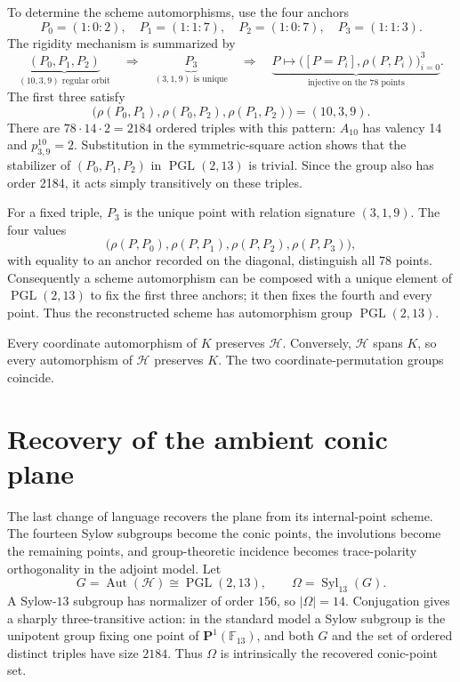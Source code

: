 \documentclass[11pt]{article}
\theoremstyle{definition}
\theoremstyle{remark}
\newcommand{\F}{\mathbb F}
\newcommand{\PGL}{\operatorname{PGL}}
\newcommand{\Aut}{\operatorname{Aut}}
\begin{document}
To determine the scheme automorphisms, use the four anchors
\[
 P_0=(1:0:2),\quad P_1=(1:1:7),\quad
 P_2=(1:0:7),\quad P_3=(1:1:3).
\]
The rigidity mechanism is summarized by
\[
 \underbrace{(P_0,P_1,P_2)}_{(10,3,9)\text{ regular orbit}}
 \quad\Longrightarrow\quad
 \underbrace{P_3}_{(3,1,9)\text{ is unique}}
 \quad\Longrightarrow\quad
 \underbrace{P\longmapsto
   \bigl([P=P_i],\rho(P,P_i)\bigr)_{i=0}^{3}}
   _{\text{injective on the 78 points}}.
\]
The first three satisfy
\[
 \bigl(\rho(P_0,P_1),\rho(P_0,P_2),\rho(P_1,P_2)\bigr)=(10,3,9).
\]
There are
\(78\cdot14\cdot2=2184\) ordered triples with this pattern: \(A_{10}\)
has valency 14 and \(p_{3,9}^{10}=2\).  Substitution in the symmetric-square
action shows that the stabilizer of \((P_0,P_1,P_2)\) in
\(\PGL(2,13)\) is trivial.  Since the group also has order 2184, it acts
simply transitively on these triples.

For a fixed triple, \(P_3\) is the unique point with relation signature
\((3,1,9)\).  The four values
\[
 \bigl(\rho(P,P_0),\rho(P,P_1),\rho(P,P_2),\rho(P,P_3)\bigr),
\]
with equality to an anchor recorded on the diagonal, distinguish all 78
points.  Consequently a scheme automorphism can be composed with a unique
element of \(\PGL(2,13)\) to fix the first three anchors; it then fixes the
fourth and every point.  Thus the reconstructed scheme has automorphism
group \(\PGL(2,13)\).

Every coordinate automorphism of \(K\) preserves \(\mathcal H\).
Conversely, \(\mathcal H\) spans \(K\), so every automorphism of
\(\mathcal H\) preserves \(K\).  The two coordinate-permutation groups
coincide.

\section{Recovery of the ambient conic plane}
\label{sec:ambient-plane}

The last change of language recovers the plane from its internal-point scheme.
The fourteen Sylow subgroups become the conic points, the involutions become
the remaining points, and group-theoretic incidence becomes trace-polarity
orthogonality in the adjoint model.
Let
\[
 G=\Aut(\mathcal H)\cong\PGL(2,13),\qquad
 \Omega=\operatorname{Syl}_{13}(G).
\]
A Sylow-\(13\) subgroup has normalizer of order \(156\), so \(|\Omega|=14\).
Conjugation gives a sharply three-transitive action: in the standard model a
Sylow subgroup is the unipotent group fixing one point of
\(\mathbf P^1(\F_{13})\), and both \(G\) and the set of ordered distinct
triples have size \(2184\).  Thus \(\Omega\) is intrinsically the recovered
conic-point set.
\end{document}
